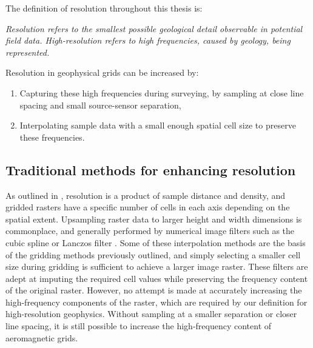 The definition of resolution throughout this thesis is:

\bigskip{}
\noindent{}\emph{Resolution refers to the smallest possible geological detail observable in potential field data. High-resolution refers to high frequencies, caused by geology, being represented.}

\bigskip{}
Resolution in geophysical grids can be increased by:
\begin{enumerate}
    \item{} Capturing these high frequencies during surveying, by sampling at close line spacing and small source-sensor separation,
    \item{} Interpolating sample data with a small enough spatial cell size to preserve these frequencies.
\end{enumerate}

%

\subsection{Traditional methods for enhancing resolution}
As outlined in , resolution is a product of sample distance and density, and gridded rasters have a specific number of cells in each axis depending on the spatial extent.
Upsampling raster data to larger height and width dimensions is commonplace, and generally performed by numerical image filters such as the cubic spline \parencite{keysCubicConvolutionInterpolation1981} or Lanczos filter \parencite{lanczos1988applied}.
Some of these interpolation methods are the basis of the gridding methods previously outlined, and simply selecting a smaller cell size during gridding is sufficient to achieve a larger image raster.
These filters are adept at imputing the required cell values while preserving the frequency content of the original raster.
However, no attempt is made at accurately increasing the high-frequency components of the raster, which are required by our definition for high-resolution geophysics.
Without sampling at a smaller separation or closer line spacing, it is still possible to increase the high-frequency content of aeromagnetic grids.

